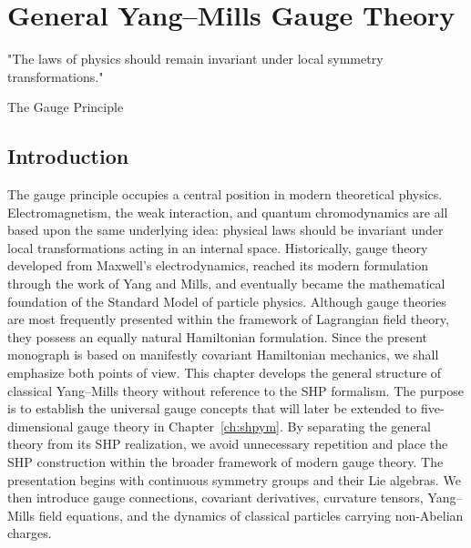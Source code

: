 \chapter{General Yang--Mills Gauge Theory}
\label{ch:yangmills}
\epigraph{%
"The laws of physics should remain invariant under local symmetry
transformations."
}{The Gauge Principle}
\section{Introduction}
The gauge principle occupies a central position in modern theoretical
physics. Electromagnetism, the weak interaction, and quantum
chromodynamics are all based upon the same underlying idea: physical
laws should be invariant under local transformations acting in an
internal space.
Historically, gauge theory developed from Maxwell's electrodynamics,
reached its modern formulation through the work of Yang and Mills, and
eventually became the mathematical foundation of the Standard Model of
particle physics. Although gauge theories are most frequently presented
within the framework of Lagrangian field theory, they possess an equally
natural Hamiltonian formulation. Since the present monograph is based on
manifestly covariant Hamiltonian mechanics, we shall emphasize both
points of view.
This chapter develops the general structure of classical Yang--Mills
theory without reference to the SHP formalism. The purpose is to
establish the universal gauge concepts that will later be extended to
five-dimensional gauge theory in Chapter~\ref{ch:shpym}. By separating
the general theory from its SHP realization, we avoid unnecessary
repetition and place the SHP construction within the broader framework
of modern gauge theory.
The presentation begins with continuous symmetry groups and their Lie
algebras. We then introduce gauge connections, covariant derivatives,
curvature tensors, Yang--Mills field equations, and the dynamics of
classical particles carrying non-Abelian charges.
